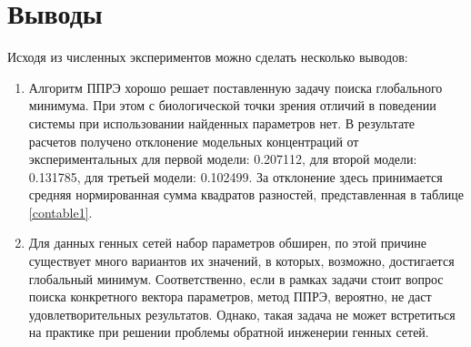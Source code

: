 \section{Выводы} \label{s4}

Исходя из численных экспериментов можно сделать несколько выводов:

\begin{enumerate}
  \item Алгоритм ППРЭ хорошо решает поставленную задачу поиска глобального 
  минимума. При этом с биологической точки зрения отличий в поведении системы 
  при использовании найденных параметров нет.
  В результате расчетов получено отклонение модельных концентраций от 
  экспериментальных для первой модели: 0.207112, для второй модели: 0.131785, 
  для третьей модели: 0.102499. 
  За отклонение здесь принимается средняя нормированная сумма квадратов
  разностей, представленная в таблице \ref{contable1}.
  \item Для данных генных сетей набор параметров обширен, по этой причине 
  существует много вариантов их значений, в которых, возможно, достигается 
  глобальный минимум. Соответственно, если в рамках задачи стоит вопрос поиска 
  конкретного вектора параметров, метод ППРЭ, вероятно, не даст 
  удовлетворительных результатов. Однако, такая задача не может встретиться 
  на практике при решении проблемы обратной инженерии генных сетей.
\end{enumerate}

\clearpage
